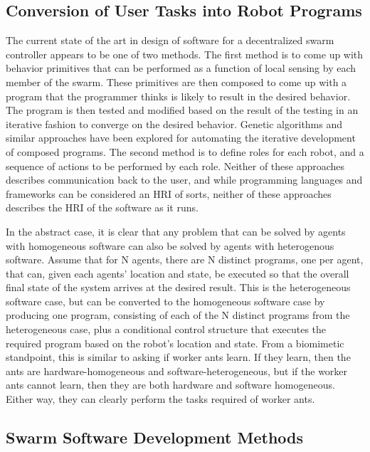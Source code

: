 \documentclass[]{article}
\begin{document}
\subsection{Conversion of User Tasks into Robot Programs} 

The current state of the art in design of software for a decentralized swarm controller appears to be one of two methods. 
The first method is to come up with behavior primitives that can be performed as a function of local sensing by each member of the swarm. 
These primitives are then composed to come up with a program that the programmer thinks is likely to result in the desired behavior. 
The program is then tested and modified based on the result of the testing in an iterative fashion to converge on the desired behavior. 
Genetic algorithms and similar approaches have been explored for automating the iterative development of composed programs. 
The second method is to define roles for each robot, and a sequence of actions to be performed by each role. 
Neither of these approaches describes communication back to the user, and while programming languages and frameworks can be considered an HRI of sorts, neither of these approaches describes the HRI of the software as it runs. 

In the abstract case, it is clear that any problem that can be solved by agents with homogeneous software can also be solved by agents with heterogenous software. 
Assume that for N agents, there are N distinct programs, one per agent, that can, given each agents' location and state, be executed so that the overall final state of the system arrives at the desired result. 
This is the heterogeneous software case, but can be converted to the homogeneous software case by producing one program, consisting of each of the N distinct programs from the heterogeneous case, plus a conditional control structure that executes the required program based on the robot's location and state.  
From a biomimetic standpoint, this is similar to asking if worker ants learn. 
If they learn, then the ants are hardware-homogeneous and software-heterogeneous, but if the worker ants cannot learn, then they are both hardware and software homogeneous. Either way, they can clearly perform the tasks required of worker ants. 

\subsection{Swarm Software Development Methods}
\end{document}
